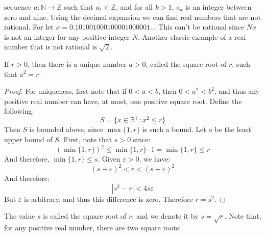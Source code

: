             sequence $a:\mathbb{N}\rightarrow\mathbb{Z}$ such that
            $a_{1}\in\mathbb{Z}$, and for all $k>1$,
            $a_{k}$ is an integer between zero and nine. Using the
            decimal expansion we can find real numbers that are
            not rational. For let
            $x=0.101001000100001000001\dots$ This can't be
            rational since $Nx$ is not an integer for any
            positive integer $N$. Another classic example of
            a real number that is not rational is $\sqrt{2}$.
            \begin{theorem}
                If $r>0$, then there is a unique number $a>0$,
                called the square root of $r$, such that
                $a^{2}=r$.
            \end{theorem}
            \begin{proof}
                For uniqueness, first note that if
                $0<a<b$, then $0<a^{2}<b^{2}$, and thus
                any positive real number can have, at most, one
                positive square root. Define the following:
                \begin{equation}
                    S=\{x\in\mathbb{R}^{+}:x^{2}\leq{r}\}
                \end{equation}
                Then $S$ is bounded above, since $\max\{1,r\}$
                is such a bound. Let $a$ be the least upper bound
                of $S$. First, note that $s>0$ since:
                \begin{equation}
                    (\min\{1,r\})^{2}\leq\min\{1,r\}\cdot{1}
                    =\min\{1,r\}\leq{r}
                \end{equation}
                And therefore, $\min\{1,r\}\leq{s}$. Given
                $\varepsilon>0$, we have:
                \begin{equation}
                    (s-\varepsilon)^{2}<r<
                    (s+\varepsilon)^{2}
                \end{equation}
                And therefore:
                \begin{equation}
                    |s^{2}-r|<4s\varepsilon
                \end{equation}
                But $\varepsilon$ is arbitrary, and thus this
                difference is zero. Therefore $r=s^{2}$.
            \end{proof}
            The value $s$ is called the square root of $r$, and
            we denote it by $s=\sqrt{r}$. Note that, for any
            positive real number, there are two square roots:
